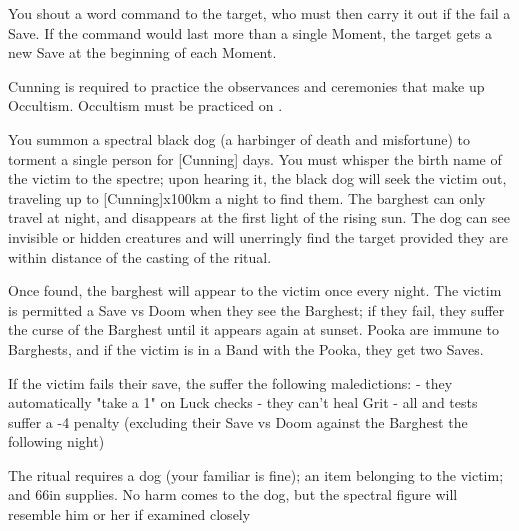 {\MYSTERY [
  Name= Command,
  Link=miracle-command,
  Paradigm=Mind,
  Save=Y,
  Duration=0 ,
  Counter= n/a  ,
  Keywords=None ,
  Target=Nearby creature
]

You shout a \DICE word command to the target, who must then carry it out if the fail a Save.  If the command would last more than a single Moment, the target gets a new Save at the beginning of each Moment.



\newpage




Cunning is required to practice the observances and ceremonies that make up Occultism.   Occultism must be practiced on .

\OCCULT[
  Name=Barghest,
  Link=occultism-barghest,
  Success=10+,
  Cost=66\AG (plus see below)
]

You summon a spectral black dog (a harbinger of death and misfortune) to torment a single person for [Cunning] days.  You must whisper the birth name of the victim to the spectre; upon hearing it, the black dog will seek the victim out, traveling up to [Cunning]x100km a night to find them.  The barghest can only travel at night, and disappears at the first light of the rising sun.  The dog can see invisible or hidden creatures and will unerringly find the target provided they are within distance of the casting of the ritual.

Once found, the barghest will appear to the victim once every night.  The victim is permitted a Save vs Doom when they see the Barghest; if they fail, they suffer the curse of the Barghest until it appears again at sunset.  Pooka are immune to Barghests, and if the victim is in a Band with the Pooka, they get two Saves.

If the victim fails their save, the suffer the following maledictions:
- they automatically "take a 1" on Luck checks
- they can't heal Grit
- all \RO and \RB tests suffer a -4 penalty (excluding their Save vs Doom against the Barghest the following night)

The ritual requires a dog (your familiar is fine); an item belonging to the victim; and 66\AG in supplies.  No harm comes to the dog, but the spectral figure will resemble him or her if examined closely

\cbreak

}
